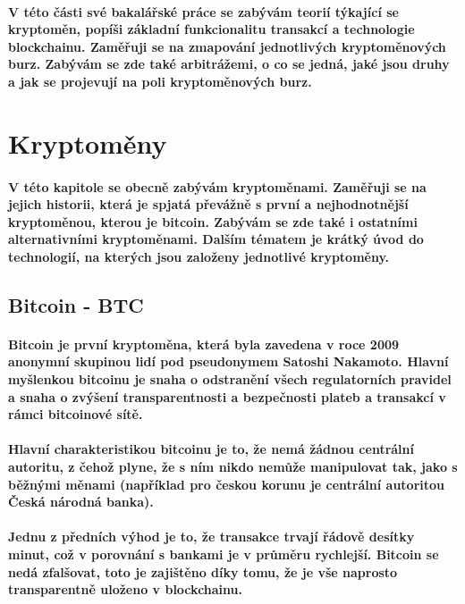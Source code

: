 \documentclass[thesis=B,czech]{FITthesis}[2019/03/21]
\begin{document}
\paragraph{
V této části své bakalářské práce se zabývám teorií týkající se kryptoměn, popíši základní funkcionalitu transakcí a technologie blockchainu. Zaměřuji se na zmapování jednotlivých kryptoměnových burz. Zabývám se zde také arbitrážemi, o co se jedná, jaké jsou druhy a jak se projevují na poli kryptoměnových burz.
}
\section{Kryptoměny}
\paragraph{
V této kapitole se obecně zabývám kryptoměnami. Zaměřuji se na jejich historii, která je spjatá převážně s první a nejhodnotnější kryptoměnou, kterou je bitcoin. Zabývám se zde také i ostatními alternativními kryptoměnami. 
Dalším tématem je krátký úvod do technologií, na kterých jsou založeny jednotlivé kryptoměny. \cite{BudoucnostFinTrhu}
}
\subsection{Bitcoin - BTC}
\paragraph{
Bitcoin je první kryptoměna, která byla zavedena v roce 2009 anonymní skupinou lidí pod pseudonymem Satoshi Nakamoto. Hlavní myšlenkou bitcoinu je snaha o odstranění všech regulatorních pravidel a snaha o zvýšení transparentnosti a bezpečnosti plateb a transakcí v rámci bitcoinové sítě. \cite{Finex}
}
\paragraph{
Hlavní charakteristikou bitcoinu je to, že nemá žádnou centrální autoritu, z čehož plyne, že s ním nikdo nemůže manipulovat tak, jako s běžnými měnami (například pro českou korunu je centrální autoritou Česká národná banka).
}
\paragraph{
Jednu z předních výhod je to, že transakce trvají řádově desítky minut, což v porovnání s bankami je v průměru rychlejší. Bitcoin se nedá zfalšovat, toto je zajištěno díky tomu, že je vše naprosto transparentně uloženo v blockchainu.
}
\end{document}
